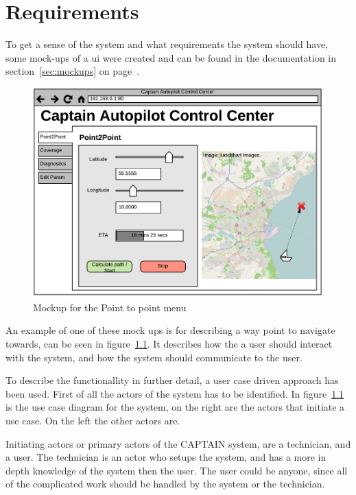 \newpage
\chapter{Requirements}
To get a sense of the system and what requirements the system should have, some mock-ups of a ui were created and can be found in the documentation in section~\ref{sec:mockups} on page~\pageref{sec:mockups}.

\begin{figure}[H]
\centering
\includegraphics[width=0.7\linewidth]{../Appendix/Project/Dokumentation/Images/Requirements_specification/UI_Mockup_Point_to_point}
\caption{Mockup for the Point to point menu}
\label{fig:uimockuppointtopoint}
\end{figure}

An example of one of these mock ups is for describing a way point to navigate towards, can be seen in figure~\ref{fig:uimockuppointtopoint}. It describes how the a user should interact with the system, and how the system should communicate to the user.

To describe the functionallity in further detail, a user case driven approach has been used. First of all the actors of the system has to be identified. In figure~\ref{fig:uimockuppointtopoint} is the use case diagram for the system, on the right are the actors that initiate a use case. On the left the other actors are.

Initiating actors or primary actors of the CAPTAIN system, are a technician, and a user. The technician is an actor who setups the system, and has a more in depth knowledge of the system then the user. The user could be anyone, since all of the complicated work should be handled by the system or the technician. 

